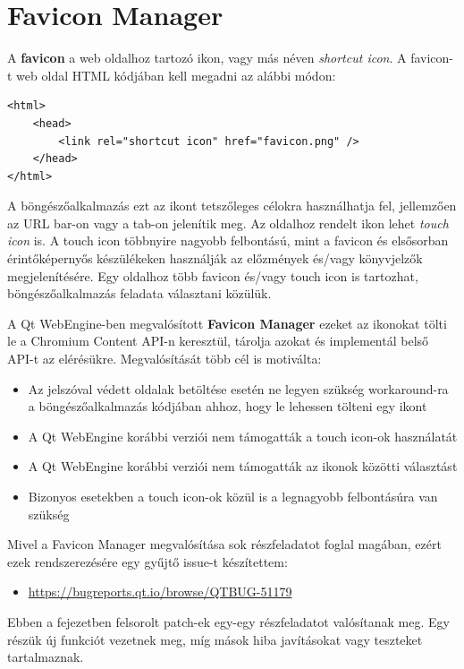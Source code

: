 \documentclass[12pt]{report}
\let\origurl\url
\renewcommand{\url}[1]{%
    \textcolor{blue}{\origurl{#1}}
}
\newcommand{\qtbug}[1]{%
    \textcolor{qtred}{\origurl{https://bugreports.qt.io/browse/QTBUG-#1}}
}
\begin{document}
\section{Favicon Manager}

\noindent
A \textbf{favicon} a web oldalhoz tartozó ikon, vagy más néven \textit{shortcut icon}. A
favicon-t web oldal HTML kódjában kell megadni az alábbi módon:
\begin{verbatim}
<html>
    <head>
        <link rel="shortcut icon" href="favicon.png" />
    </head>
</html>
\end{verbatim}
A böngészőalkalmazás ezt az ikont tetszőleges célokra használhatja fel, jellemzően az URL
bar-on vagy a tab-on jelenítik meg.
Az oldalhoz rendelt ikon lehet \textit{touch icon} is. A touch icon többnyire nagyobb
felbontású, mint a favicon és elsősorban érintőképernyős készülékeken használják az
előzmények és/vagy könyvjelzők megjelenítésére. Egy oldalhoz több favicon és/vagy touch icon
is tartozhat, böngészőalkalmazás feladata választani közülük.

A Qt WebEngine-ben megvalósított \textbf{Favicon Manager} ezeket az ikonokat tölti le a
Chromium Content API-n keresztül, tárolja azokat és implementál belső API-t az elérésükre.
Megvalósítását több cél is motiválta:
\begin{itemize}
    \item Az jelszóval védett oldalak betöltése esetén ne legyen szükség workaround-ra a
        böngészőalkalmazás kódjában ahhoz, hogy le lehessen tölteni egy ikont
    \item A Qt WebEngine korábbi verziói nem támogatták a touch icon-ok használatát
    \item A Qt WebEngine korábbi verziói nem támogatták az ikonok közötti választást
    \item Bizonyos esetekben a touch icon-ok közül is a legnagyobb felbontásúra van szükség
\end{itemize}

Mivel a Favicon Manager megvalósítása sok részfeladatot foglal magában, ezért ezek
rendszerezésére egy gyűjtő issue-t készítettem:
\begin{center}
    \begin{issuebox}
        \begin{itemize}
            \renewcommand{\labelitemi}{\textcolor{qtred}{$\blacktriangleright$}}
            \item \qtbug{51179}
        \end{itemize}
    \end{issuebox}
\end{center}
Ebben a fejezetben felsorolt patch-ek egy-egy részfeladatot valósítanak meg. Egy részük
új funkciót vezetnek meg, míg mások hiba javításokat vagy teszteket tartalmaznak.
\end{document}
